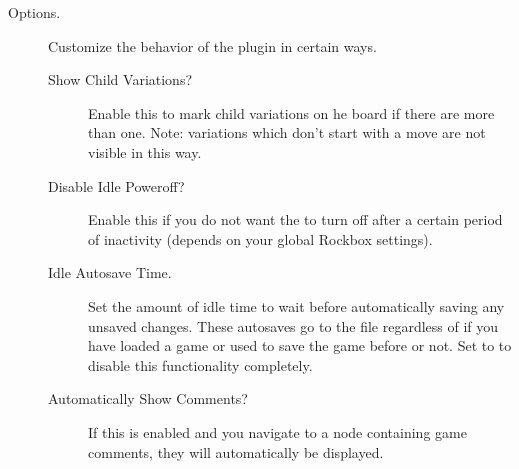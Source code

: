 \begin {description}
\item [Options. ]
    Customize the behavior of the plugin in certain ways.
    \begin{description}
        \item[Show Child Variations?] Enable this to mark child variations on 
            he board if there are more than one.  Note: variations which don't
            start with a move are not visible in this way.
        \item[Disable Idle Poweroff?] Enable this if you do not want the \dap{}
            to turn off after a certain period of inactivity (depends on your
            global Rockbox settings).
        \item[Idle Autosave Time.] Set the amount of idle time to wait before
            automatically saving any unsaved changes.  These autosaves go to
            the file  regardless of if you have
            loaded a game or used  to save the game before or
            not.  Set to  to disable this functionality completely.
        \item[Automatically Show Comments?] If this is enabled and you navigate
            to a node containing game comments, they will automatically be
            displayed.
    \end{description}


\end{description}

